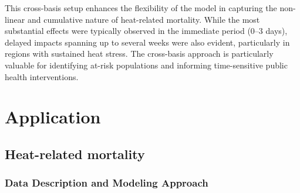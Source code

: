 \documentclass[
]{krantz}
\begin{document}
This cross-basis setup enhances the flexibility of the model in capturing the non-linear and cumulative nature of heat-related mortality. While the most substantial effects were typically observed in the immediate period (0--3 days), delayed impacts spanning up to several weeks were also evident, particularly in regions with sustained heat stress. The cross-basis approach is particularly valuable for identifying at-risk populations and informing time-sensitive public health interventions.

\section{Application}\label{application}

\subsection{Heat-related mortality}\label{heat-related-mortality}

\subsubsection{Data Description and Modeling Approach}\label{data-description-and-modeling-approach}
\end{document}

